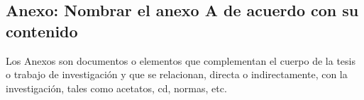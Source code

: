 \begin{appendix}
\chapter{Anexo: Nombrar el anexo A de acuerdo con su contenido}\label{AnexoA}
Los Anexos son documentos o elementos que complementan el cuerpo de la tesis o trabajo de investigaci\'{o}n y que se relacionan, directa o indirectamente, con la investigaci\'{o}n, tales como acetatos, cd, normas, etc.\\





\end{appendix}
